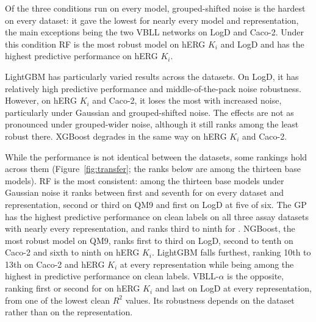 Of the three conditions run on every model, grouped-shifted noise is the hardest on every dataset: it gave the lowest \aucnorm{} for nearly every model and representation, the main exceptions being the two VBLL networks on LogD and Caco-2. Under this condition RF is the most robust model on hERG $K_i$ and LogD and has the highest predictive performance on hERG $K_i$.

LightGBM has particularly varied results across the datasets. On LogD, it has relatively high predictive performance and middle-of-the-pack noise robustness. However, on hERG $K_i$ and Caco-2, it loses the most with increased noise, particularly under Gaussian and grouped-shifted noise. The effects are not as pronounced under grouped-wider noise, although it still ranks among the least robust there. XGBoost degrades in the same way on hERG $K_i$ and Caco-2.

While the performance is not identical between the datasets, some rankings hold across them (Figure~\ref{fig:transfer}; the ranks below are among the thirteen base models). RF is the most consistent: among the thirteen base models under Gaussian noise it ranks between first and seventh for \aucnorm{} on every dataset and representation, second or third on QM9 and first on LogD at five of six. The GP has the highest predictive performance on clean labels on all three assay datasets with nearly every representation, and ranks third to ninth for \aucnorm. NGBoost, the most robust model on QM9, ranks first to third on LogD, second to tenth on Caco-2 and sixth to ninth on hERG $K_i$. LightGBM falls furthest, ranking 10th to 13th on Caco-2 and hERG $K_i$ at every representation while being among the highest in predictive performance on clean labels. VBLL-$\alpha$ is the opposite, ranking first or second for \aucnorm{} on hERG $K_i$ and last on LogD at every representation, from one of the lowest clean $R^2$ values. Its robustness depends on the dataset rather than on the representation.

